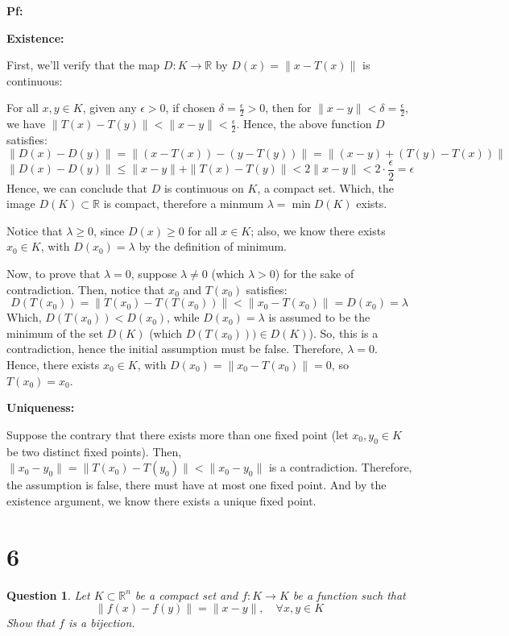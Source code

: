 \documentclass{article}
\newtheorem{question}{Question}
\begin{document}
\textbf{Pf:}

\textbf{Existence:}

First, we'll verify that the map $D:K\rightarrow\mathbb{R}$ by $D(x)=\|x-T(x)\|$ is continuous:

For all $x,y\in K$, given any $\epsilon>0$, if chosen $\delta=\frac{\epsilon}{2}>0$, then for $\|x-y\|<\delta=\frac{\epsilon}{2}$, we have $\|T(x)-T(y)\|<\|x-y\|<\frac{\epsilon}{2}$.
Hence, the above function $D$ satisfies:
$$\|D(x)-D(y)\|=\|(x-T(x))-(y-T(y))\| = \|(x-y)+(T(y)-T(x))\|$$
$$\|D(x)-D(y)\| \leq \|x-y\| + \|T(x)-T(y)\| < 2\|x-y\| < 2\cdot\frac{\epsilon}{2}=\epsilon$$
Hence, we can conclude that $D$ is continuous on $K$, a compact set. Which, the image $D(K)\subset \mathbb{R}$ is compact, therefore a minmum $\lambda=\min D(K)$ exists.

Notice that $\lambda \geq 0$, since $D(x)\geq 0$ for all $x\in K$; also, we know there exists $x_0\in K$, with $D(x_0)=\lambda$ by the definition of minimum.

Now, to prove that $\lambda=0$, suppose $\lambda \neq 0$ (which $\lambda>0$) for the sake of contradiction. Then, notice that $x_0$ and $T(x_0)$ satisfies:
$$D(T(x_0))=\|T(x_0)-T(T(x_0))\|<\|x_0-T(x_0)\| = D(x_0)=\lambda$$
Which, $D(T(x_0))<D(x_0)$, while $D(x_0)=\lambda$ is assumed to be the minimum of the set $D(K)$ (which $D(T(x_0)))\in D(K)$). So, this is a contradiction,
hence the initial assumption must be false. Therefore, $\lambda=0$. Hence, there exists $x_0\in K$, with $D(x_0)=\|x_0-T(x_0)\|=0$, so $T(x_0)=x_0$.

\hfil

\textbf{Uniqueness:}

Suppose the contrary that there exists more than one fixed point (let $x_0,y_0\in K$ be two distinct fixed points). Then, $\|x_0-y_0\|=\|T(x_0)-T(y_0)\|<\|x_0-y_0\|$ is a contradiction.
Therefore, the assumption is false, there must have at most one fixed point. And by the existence argument, we know there exists a unique fixed point.

\hfil

\hfil

\section*{6}
\begin{myBox}[]{}
    \begin{question}
        Let $K\subset \mathbb{R}^n$
        be a compact set and $f : K \rightarrow K$ be a function such that
        $$\|f(x)-f(y)\|=\|x-y\|,\quad \forall x,y\in K$$
        Show that $f$ is a bijection.
    \end{question}
\end{myBox}
\end{document}
